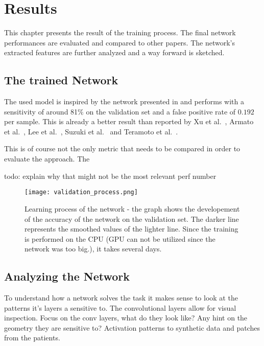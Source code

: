 \documentclass[main.tex]{subfiles}
\begin{document}
\chapter{Results}\label{chap:results}
This chapter presents the result of the training process. The final network performances are evaluated and compared to other papers. The network's extracted features are further analyzed and a way forward is sketched.

\section{The trained Network}
The used model is inspired by the network presented in \cite{huang2017lung} and performs with a sensitivity of around 81$\%$ on the validation set and a false positive rate of $0.192$ per sample. This is already a better result than reported by Xu et al.~\cite{xu1997development}, Armato et al.~\cite{armato1999computerized}, Lee et al.~\cite{lee2001automated}, Suzuki et al.~\cite{suzuki2003massive} and Teramoto et al.~\cite{teramoto2013fast}.  

This is of course not the only metric that needs to be compared in order to evaluate the approach. The 


todo: explain why that might not be the most relevant perf number


\begin{figure}
\begin{center}
\texttt{[image: validation\_process.png]}
\end{center}
\caption{Learning process of the network - the graph shows the developement of the accuracy of the network on the validation set. The darker line represents the smoothed values of the lighter line. Since the training is performed on the CPU (GPU can not be utilized since the network was too big.), it takes several days.}
\label{fig:validation}
\end{figure}


\section{Analyzing the Network}
To understand how a network solves the task it makes sense to look at the patterns it's layers a sensitive to. The convolutional layers allow for visual inspection.
Focus on the conv layers, what do they look like? Any hint on the geometry they are sensitive to?
Activation patterns to synthetic data and patches from the patients.
\end{document}
